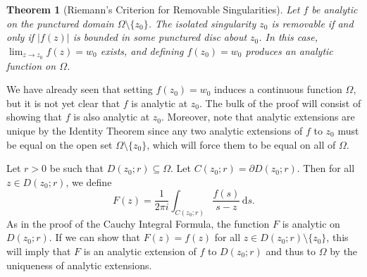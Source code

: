 \documentclass[10pt]{article}
\makeatletter
\newcommand{\dd}{\,\mathrm{d}}
\theoremstyle{newstyle}
\newtheorem{thm}{Theorem}[section]
\newenvironment{pf}[1][\proofname]{\par
  \pushQED{\qed}%
  \normalfont \topsep0\p@\relax
  \trivlist
  \item[\hskip\labelsep\scshape
  #1\@addpunct{.}]\ignorespaces
}{%
  \popQED\endtrivlist\@endpefalse
}
\makeatother
\begin{document}
\begin{thm}[Riemann's Criterion for Removable Singularities]
Let $f$ be analytic on the punctured domain $\Omega \setminus \{z_0\}$. The isolated singularity 
$z_0$ is removable if and only if $|f(z)|$ is bounded in some punctured disc about $z_0$. 
In this case, $\lim_{z\to z_0} f(z) = w_0$ exists, and defining $f(z_0) = w_0$ produces an 
analytic function on $\Omega$. 
\end{thm}
\begin{pf}
We have already seen that setting $f(z_0) = w_0$ induces a continuous function $\Omega$, but 
it is not yet clear that $f$ is analytic at $z_0$. The bulk of the proof will consist of 
showing that $f$ is also analytic at $z_0$. Moreover, note that analytic extensions are unique 
by the Identity Theorem since any two analytic extensions of $f$ to $z_0$ must be equal 
on the open set $\Omega \setminus \{z_0\}$, which will force them to be equal on all of $\Omega$. 

Let $r > 0$ be such that $D(z_0; r) \subseteq \Omega$. Let $C(z_0; r) = \partial D(z_0; r)$. Then 
for all $z \in D(z_0; r)$, we define 
\[ F(z) = \frac{1}{2\pi i} \int_{C(z_0; r)} \frac{f(s)}{s-z}\dd s. \]
As in the proof of the Cauchy Integral Formula, the function $F$ is analytic on $D(z_0; r)$. 
If we can show that $F(z) = f(z)$ for all $z \in D(z_0; r) \setminus \{z_0\}$, this will 
imply that $F$ is an analytic extension of $f$ to $D(z_0; r)$ and thus to $\Omega$ by the uniqueness 
of analytic extensions. 


\end{pf}
\end{document}
